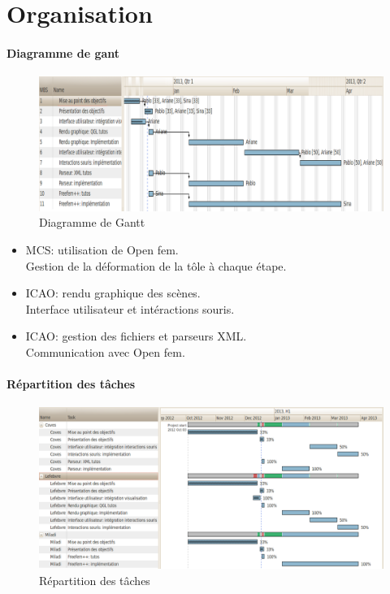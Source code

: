 \documentclass{beamer}
\begin{document}
\section{Organisation}
\begin{frame}
    \framesubtitle{Diagramme de gant}
    \begin{figure}
        \includegraphics[width=\textwidth]{img/gantt.png}
        \caption{Diagramme de Gantt}
        \label{DiagrammeDeGant}
    \end{figure}
\end{frame}
\begin{frame}
    \begin{itemize}
        \item MCS: utilisation de Open fem.\\
            Gestion de la déformation de la tôle à chaque étape.
        \item ICAO: rendu graphique des scènes.\\
            Interface utilisateur et intéractions souris.
        \item ICAO: gestion des fichiers et parseurs XML.\\
            Communication avec Open fem.
    \end{itemize}
\end{frame}
\begin{frame}
    \framesubtitle{Répartition des tâches}
    \begin{figure}
        \includegraphics[width=\textwidth]{img/ganttRepartition.png}
        \caption{Répartition des tâches}
        \label{Répartition}
    \end{figure}
\end{frame}
\end{document}
